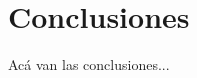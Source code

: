 \chapter{Conclusiones}
\label{chap:conclusiones}


Acá van las conclusiones...

\clearemptydoublepage
